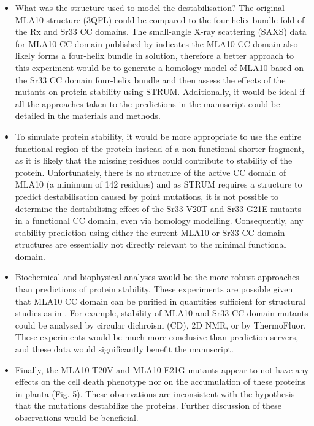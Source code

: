 \documentclass[10pt]{article}
\let\cite\citep
\providecommand\citep{\cite}
\providecommand{\tightlist}{\setlength{\itemsep}{0pt}\setlength{\parskip}{0pt}}%
\begin{document}
\begin{itemize}
\tightlist
\item
  What was the structure used to model the destabilisation? The original
  MLA10 structure (3QFL) could be compared to the four-helix bundle fold
  of the Rx and Sr33 CC domains. The small-angle X-ray scattering (SAXS)
  data for MLA10 CC domain published by \cite{Casey2016} indicates the
  MLA10 CC domain also likely forms a four-helix bundle in solution,
  therefore a better approach to this experiment would be to generate a
  homology model of MLA10 based on the Sr33 CC domain four-helix bundle
  and then assess the effects of the mutants on protein stability using
  STRUM. Additionally, it would be ideal if all the approaches taken to
  the predictions in the manuscript could be detailed in the materials
  and methods.
\item
  To simulate protein stability, it would be more appropriate to use the
  entire functional region of the protein instead of a non-functional
  shorter fragment, as it is likely that the missing residues could
  contribute to stability of the protein. Unfortunately, there is no
  structure of the active CC domain of MLA10 (a minimum of 142 residues)
  and as STRUM requires a structure to predict destabilisation caused by
  point mutations, it is not possible to determine the destabilising
  effect of the Sr33 V20T and Sr33 G21E mutants in a functional CC
  domain, even via homology modelling. Consequently, any stability
  prediction using either the current MLA10 or Sr33 CC domain structures
  are essentially not directly relevant to the minimal functional
  domain.~
\item
  Biochemical and biophysical analyses would be the more robust
  approaches than predictions of protein stability. These experiments
  are possible given that MLA10 CC domain can be purified in quantities
  sufficient for structural studies as in \cite{Maekawa2011}. For
  example, stability of MLA10 and Sr33 CC domain mutants could be
  analysed by circular dichroism (CD), 2D NMR, or by ThermoFluor. These
  experiments would be much more conclusive than prediction servers, and
  these data would significantly benefit the manuscript.
\item
  Finally, the MLA10 T20V and MLA10 E21G mutants appear to not have any
  effects on the cell death phenotype nor on the accumulation of these
  proteins in planta (Fig. 5). These observations are inconsistent with
  the hypothesis that the mutations destabilize the proteins. Further
  discussion of these observations would be beneficial.
\end{itemize}
\end{document}
